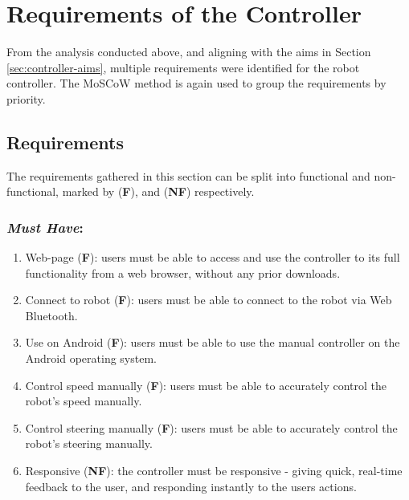 \documentclass{l4proj}
\begin{document}
\section{Requirements of the Controller}\label{sec:controller-req}
From the analysis conducted above, and aligning with the aims in Section \ref{sec:controller-aims}, multiple requirements were identified for the robot controller. The MoSCoW method is again used to group the requirements by priority.

\subsection{Requirements}
The requirements gathered in this section can be split into functional and non-functional, marked by (\textbf{F}), and (\textbf{NF}) respectively.

\subsubsection{\textit{Must Have}:}
\begin{enumerate}[label=B.\arabic*]
    \item Web-page (\textbf{F}): users must be able to access and use the controller to its full functionality from a web browser, without any prior downloads.
    \item Connect to robot (\textbf{F}): users must be able to connect to the robot via Web Bluetooth.
    \item Use on Android (\textbf{F}): users must be able to use the manual controller on the Android operating system.
    \item Control speed manually (\textbf{F}): users must be able to accurately control the robot’s speed manually.
    \item Control steering manually (\textbf{F}): users must be able to accurately control the robot’s steering manually.
    \item Responsive (\textbf{NF}): the controller must be responsive - giving quick, real-time feedback to the user, and responding instantly to the users actions.
\end{enumerate}
\end{document}
